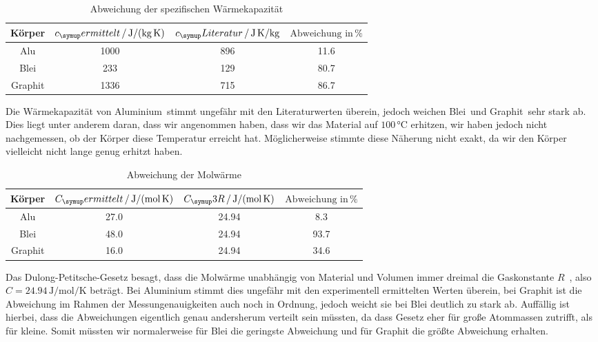 \begin{table}
  \centering
  \begin{tabular}{c c c c}
    \toprule
    Körper & $c_\su{ermittelt}\,/\,\si{\joule\per\kilo\gram\per\kelvin}$ &
    $c_\su{Literatur}\,/\,\si{\joule\per\kilo\gram\kelvin}$\cite{bleialu} & $\text{Abweichung in}\,\%$ \\
    \midrule
    Alu & 1000 & 896 & 11.6 \\
    Blei & 233 & 129 & 80.7\\
    Graphit & 1336 & 715 & 86.7 \\
    \bottomrule
  \end{tabular}
  \caption{Abweichung der spezifischen Wärmekapazität}
\end{table}
Die Wärmekapazität von Aluminium\,\cite{bleialu} stimmt ungefähr mit den Literaturwerten überein,
jedoch weichen Blei\,\cite{bleialu} und Graphit\,\cite{graphit} sehr stark ab.
Dies liegt unter anderem daran,
dass wir angenommen haben, dass wir das Material auf $100\,\si{\celsius}$ erhitzen,
wir haben jedoch nicht nachgemessen, ob der Körper diese Temperatur erreicht hat.
Möglicherweise stimmte diese Näherung nicht exakt, da wir den Körper vielleicht
nicht lange genug erhitzt haben.

\begin{table}
  \centering
  \begin{tabular}{c c c c}
    \toprule
    Körper & $C_\su{ermittelt}\,/\,\si{\joule\per\mol\per\kelvin}$ &
    $C_\su{3R}\,/\,\si{\joule\per\mol\per\kelvin}$ & $\text{Abweichung in} \,\%$ \\
    \midrule
    Alu & 27.0 & 24.94 & 8.3 \\
    Blei & 48.0 & 24.94 & 93.7 \\
    Graphit & 16.0 & 24.94 & 34.6 \\
    \bottomrule
  \end{tabular}
  \caption{Abweichung der Molwärme}
\end{table}
Das Dulong-Petitsche-Gesetz besagt, dass die Molwärme unabhängig von Material und
Volumen immer dreimal die Gaskonstante $R$ \,\cite{chemie}, also
$ C = 24.94 \,\si{\joule\per\mol\per\kelvin}$
beträgt. Bei Aluminium stimmt dies ungefähr mit den experimentell
ermittelten Werten überein, bei Graphit ist die Abweichung im Rahmen der Messungenauigkeiten
auch noch in Ordnung, jedoch weicht sie bei Blei deutlich zu stark ab. Auffällig ist hierbei,
dass die Abweichungen eigentlich genau andersherum verteilt sein müssten, da dass Gesetz
eher für große Atommassen zutrifft, als für kleine. Somit müssten wir normalerweise für Blei
die geringste Abweichung und für Graphit die größte Abweichung erhalten.
